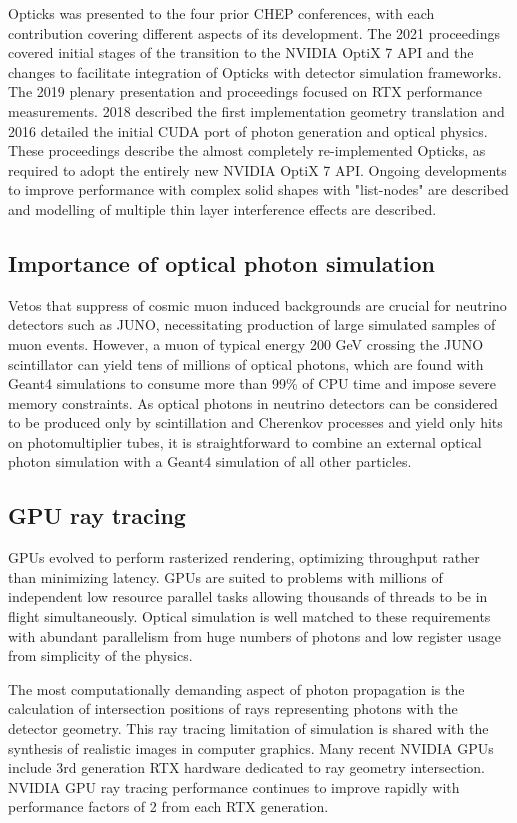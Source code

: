 \documentclass{webofc}
\begin{document}
Opticks was presented to the four prior CHEP conferences, with each contribution
covering different aspects of its development. The 2021\cite{chep2021} proceedings 
covered initial stages of the transition to the NVIDIA OptiX 7 API and 
the changes to facilitate integration of Opticks with detector simulation frameworks. 
The 2019 plenary presentation and proceedings\cite{chep2019} focused on RTX performance measurements.
2018\cite{chep2018} described the first implementation geometry translation and 
2016\cite{chep2016} detailed the initial CUDA port of photon generation and optical physics.
%
%
These proceedings describe the almost completely re-implemented Opticks,
as required to adopt the entirely new NVIDIA OptiX 7 API. 
Ongoing developments to improve performance with complex solid shapes with "list-nodes" are described
and modelling of multiple thin layer interference effects are described. 
%
%
\subsection{Importance of optical photon simulation}%
%
%
Vetos that suppress of cosmic muon induced backgrounds are crucial for neutrino
detectors such as JUNO\cite{juno}, necessitating production of large simulated samples of muon events. 
However, a muon of typical energy 200 GeV crossing the JUNO scintillator can yield tens of millions of 
optical photons, which are found with Geant4 simulations to consume more than 99\% of CPU time
and impose severe memory constraints.
%
As optical photons in neutrino detectors can be considered to be produced
only by scintillation and Cherenkov processes and yield only hits
on photomultiplier tubes, it is straightforward to combine an external optical photon simulation 
with a Geant4 simulation of all other particles.
%
\subsection{GPU ray tracing}%
%
GPUs evolved to perform rasterized rendering, optimizing throughput\cite{throughput} rather than minimizing latency.
GPUs are suited to problems with millions of independent low resource parallel tasks allowing thousands of threads 
to be in flight simultaneously.
Optical simulation is well matched to these requirements with abundant parallelism 
from huge numbers of photons and low register usage from simplicity of the physics.

The most computationally demanding aspect of photon propagation
is the calculation of intersection positions of rays representing photons with the detector geometry.
This ray tracing limitation of simulation is shared with the synthesis of realistic images in computer graphics. 
Many recent NVIDIA GPUs include 3rd generation RTX hardware dedicated to ray geometry intersection. 
NVIDIA GPU ray tracing performance continues to improve rapidly with performance factors of 2 
from each RTX generation. 
%
%
\end{document}
